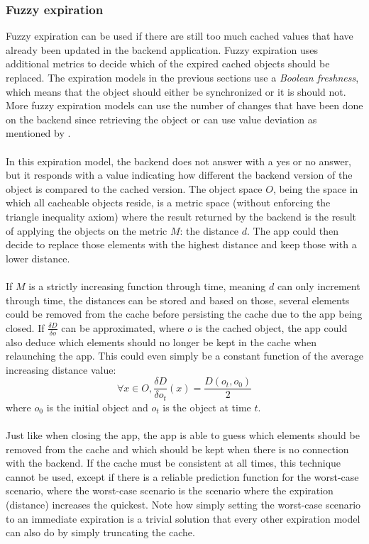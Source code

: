 \documentclass[pdftex,a4paper,12pt,twoside]{report}
\begin{document}
\subsubsection{Fuzzy expiration}
Fuzzy expiration can be used if there are still too much cached values that have already been updated in the backend application. Fuzzy expiration uses additional metrics to decide which of the expired cached objects should be replaced. The expiration models in the previous sections use a \emph{Boolean freshness}, which means that the object should either be synchronized or it is should not. More fuzzy expiration models can use the number of changes that have been done on the backend since retrieving the object or can use value deviation as mentioned by \cite{olston2002best}.
\\\\
In this expiration model, the backend does not answer with a yes or no answer, but it responds with a value indicating how different the backend version of the object is compared to the cached version. The object space $O$, being the space in which all cacheable objects reside, is a metric space (without enforcing the triangle inequality axiom) where the result returned by the backend is the result of applying the objects on the metric $M$: the distance $d$. The app could then decide to replace those elements with the highest distance and keep those with a lower distance.
\\\\
If $M$ is a strictly increasing function through time, meaning $d$ can only increment through time, the distances can be stored and based on those, several elements could be removed from the cache before persisting the cache due to the app being closed. If $\frac{\delta D}{\delta o}$ can be approximated, where $o$ is the cached object, the app could also deduce which elements should no longer be kept in the cache when relaunching the app. This could even simply be a constant function of the average increasing distance value:
\[
\forall x \in O, \frac{\delta D}{\delta o_t}(x) = \frac{D(o_t, o_0)}{2}
\]
where $o_0$ is the initial object and $o_t$ is the object at time $t$.
\\\\
Just like when closing the app, the app is able to guess which elements should be removed from the cache and which should be kept when there is no connection with the backend. If the cache must be consistent at all times, this technique cannot be used, except if there is a reliable prediction function for the worst-case scenario, where the worst-case scenario is the scenario where the expiration (distance) increases the quickest. Note how simply setting the worst-case scenario to an immediate expiration is a trivial solution that every other expiration model can also do by simply truncating the cache.
\end{document}

